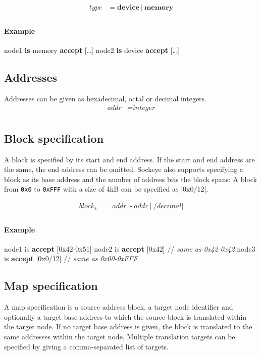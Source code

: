\documentclass[a4paper,11pt,twoside]{report}
\begin{document}
{{{\begin{align*}
\textit{type} & \mathop{=}
	\textbf{device}\
	|\
	\textbf{memory} \\
\end{align*}

\paragraph{Example}
\begin{syntax}
	node1 \textbf{is} memory \textbf{accept} [\ldots]
	node2 \textbf{is} device \textbf{accept} [\ldots]
\end{syntax}

\subsection{Addresses}
Addresses can be given as hexadecimal, octal or decimal integers.
\begin{align*}
\textit{addr} & \mathop{=} \textit{integer} \\
\end{align*}

\clearpage
\subsection{Block specification}{}
A block is specified by its start and end address.
If the start and end address are the same, the end address can be omitted.
Sockeye also supports specifying a block as its base address and the number of address bits the block spans:
A block from \texttt{0x0} to \texttt{0xFFF} with a size of 4kB can be specified as \Sockeye|0x0/12|.

\begin{align*}
\textit{block}_s & \mathop{=} \textit{addr}\
	\Big[
		\textbf{-}\ \textit{addr}\ 
	\Big|\
		\textbf{/}decimal
	\Big] \\
\end{align*}

\paragraph{Example}
\begin{syntax}
	node1 is \textbf{accept} [0x42-0x51]
	node2 is \textbf{accept} [0x42]      // \textit{same as \textup{0x42-0x42}}
	node3 is \textbf{accept} [0x0/12]    // \textit{same as \textup{0x00-0xFFF}}
\end{syntax}

\subsection{Map specification}
A map specification is a source address block, a target node identifier and optionally a target base address to which the source block is translated within the target node.
If no target base address is given, the block is translated to the same addresses within the target node.
Multiple translation targets can be specified by giving a comma-separated list of targets.

}}}
\end{document}
